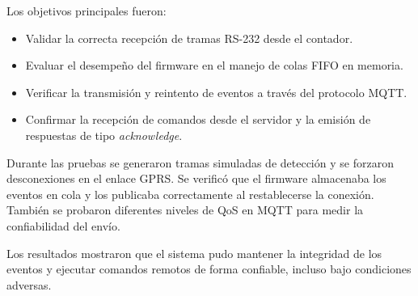 
Los objetivos principales fueron:  
\begin{itemize}
    \item Validar la correcta recepción de tramas RS-232 desde el contador.
    \item Evaluar el desempeño del firmware en el manejo de colas FIFO en memoria.
    \item Verificar la transmisión y reintento de eventos a través del protocolo MQTT.
    \item Confirmar la recepción de comandos desde el servidor y la emisión de respuestas de tipo \textit{acknowledge}.
\end{itemize}

Durante las pruebas se generaron tramas simuladas de detección y se forzaron desconexiones en el enlace GPRS. 
Se verificó que el firmware almacenaba los eventos en cola y los publicaba correctamente al restablecerse la conexión. 
También se probaron diferentes niveles de QoS en MQTT para medir la confiabilidad del envío.  


Los resultados mostraron que el sistema pudo mantener la integridad de los eventos y ejecutar comandos remotos de forma confiable, incluso bajo condiciones adversas.  

